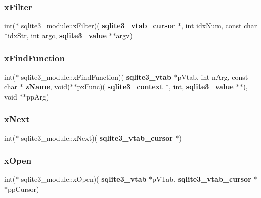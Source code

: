 \mbox{\label{structsqlite3__module_a1ddde32dcae461910096ebb2c42d1a6a}} 
\subsubsection{xFilter}
{\footnotesize\ttfamily int($\ast$ sqlite3\+\_\+module\+::x\+Filter)(\textbf{ sqlite3\+\_\+vtab\+\_\+cursor} $\ast$, int idx\+Num, const char $\ast$idx\+Str, int argc, \textbf{ sqlite3\+\_\+value} $\ast$$\ast$argv)}

\mbox{\label{structsqlite3__module_ae70a020a7dda960b91943e9f67695dbb}} 
\subsubsection{xFindFunction}
{\footnotesize\ttfamily int($\ast$ sqlite3\+\_\+module\+::x\+Find\+Function)(\textbf{ sqlite3\+\_\+vtab} $\ast$p\+Vtab, int n\+Arg, const char $\ast$\textbf{ z\+Name}, void($\ast$$\ast$px\+Func)(\textbf{ sqlite3\+\_\+context} $\ast$, int, \textbf{ sqlite3\+\_\+value} $\ast$$\ast$), void $\ast$$\ast$pp\+Arg)}

\mbox{\label{structsqlite3__module_aa739d9a2081db7bf786f1f9fb9d92264}} 
\subsubsection{xNext}
{\footnotesize\ttfamily int($\ast$ sqlite3\+\_\+module\+::x\+Next)(\textbf{ sqlite3\+\_\+vtab\+\_\+cursor} $\ast$)}

\mbox{\label{structsqlite3__module_a2cb9f8c149617189efa6ceec0a3211e9}} 
\subsubsection{xOpen}
{\footnotesize\ttfamily int($\ast$ sqlite3\+\_\+module\+::x\+Open)(\textbf{ sqlite3\+\_\+vtab} $\ast$p\+V\+Tab, \textbf{ sqlite3\+\_\+vtab\+\_\+cursor} $\ast$$\ast$pp\+Cursor)}

\mbox{\label{structsqlite3__module_a8dcaa6dc6d9563c8da57e4c8c5055609}} 

